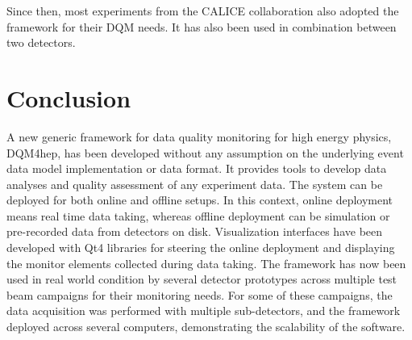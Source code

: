 \documentclass{webofc}
\begin{document}
Since then, most experiments from the CALICE collaboration also adopted the framework for their DQM needs. It has also been used in combination between two detectors.

\section{Conclusion}
\label{sec:conclusion}

A new generic framework for data quality monitoring for high energy physics, DQM4hep, has been developed without any assumption on the underlying event data model implementation or data format.
It provides tools to develop data analyses and quality assessment of any experiment data.
The system can be deployed for both online and offline setups.
In this context, online deployment means real time data taking, whereas offline deployment can be simulation or pre-recorded data from detectors on disk. 
Visualization interfaces have been developed with Qt4 libraries for steering the online deployment and displaying the monitor elements collected during data taking.
The framework has now been used in real world condition by several detector prototypes across multiple test beam campaigns for their monitoring needs.
For some of these campaigns, the data acquisition was performed with multiple sub-detectors, and the framework deployed across several computers, demonstrating the scalability of the software.



\end{document}
